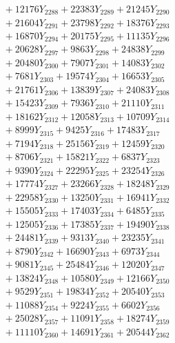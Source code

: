 \documentclass[a4paper,10pt]{article}
\begin{document}
{\begin{align}
&\;  + 12176 Y_{2288} + 22383 Y_{2289} + 21245 Y_{2290} \\[0.3ex]
&\;  + 21604 Y_{2291} + 23798 Y_{2292} + 18376 Y_{2293} \\[0.3ex]
&\;  + 16870 Y_{2294} + 20175 Y_{2295} + 11135 Y_{2296} \\[0.3ex]
&\;  + 20628 Y_{2297} + 9863 Y_{2298} + 24838 Y_{2299} \\[0.3ex]
&\;  + 20480 Y_{2300} + 7907 Y_{2301} + 14083 Y_{2302} \\[0.3ex]
&\;  + 7681 Y_{2303} + 19574 Y_{2304} + 16653 Y_{2305} \\[0.3ex]
&\;  + 21761 Y_{2306} + 13839 Y_{2307} + 24083 Y_{2308} \\[0.5ex]\allowbreak
&\;  + 15423 Y_{2309} + 7936 Y_{2310} + 21110 Y_{2311} \\[0.3ex]
&\;  + 18162 Y_{2312} + 12058 Y_{2313} + 10709 Y_{2314} \\[0.3ex]
&\;  + 8999 Y_{2315} + 9425 Y_{2316} + 17483 Y_{2317} \\[0.3ex]
&\;  + 7194 Y_{2318} + 25156 Y_{2319} + 12459 Y_{2320} \\[0.3ex]
&\;  + 8706 Y_{2321} + 15821 Y_{2322} + 6837 Y_{2323} \\[0.3ex]
&\;  + 9390 Y_{2324} + 22295 Y_{2325} + 23254 Y_{2326} \\[0.3ex]
&\;  + 17774 Y_{2327} + 23266 Y_{2328} + 18248 Y_{2329} \\[0.3ex]
&\;  + 22958 Y_{2330} + 13250 Y_{2331} + 16941 Y_{2332} \\[0.3ex]
&\;  + 15505 Y_{2333} + 17403 Y_{2334} + 6485 Y_{2335} \\[0.3ex]
&\;  + 12505 Y_{2336} + 17385 Y_{2337} + 19490 Y_{2338} \\[0.5ex]\allowbreak
&\;  + 24481 Y_{2339} + 9313 Y_{2340} + 23235 Y_{2341} \\[0.3ex]
&\;  + 8790 Y_{2342} + 16690 Y_{2343} + 6973 Y_{2344} \\[0.3ex]
&\;  + 9081 Y_{2345} + 25484 Y_{2346} + 12020 Y_{2347} \\[0.3ex]
&\;  + 13824 Y_{2348} + 10580 Y_{2349} + 12166 Y_{2350} \\[0.3ex]
&\;  + 9529 Y_{2351} + 19834 Y_{2352} + 20540 Y_{2353} \\[0.3ex]
&\;  + 11088 Y_{2354} + 9224 Y_{2355} + 6602 Y_{2356} \\[0.3ex]
&\;  + 25028 Y_{2357} + 11091 Y_{2358} + 18274 Y_{2359} \\[0.3ex]
&\;  + 11110 Y_{2360} + 14691 Y_{2361} + 20544 Y_{2362} \\[0.3ex]

\end{align}}
\end{document}
